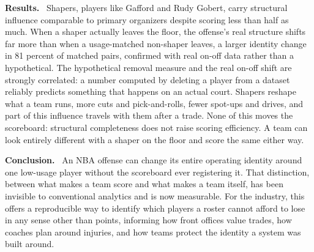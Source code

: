 \documentclass[11pt,letterpaper]{article}
\newcommand{\abssection}[1]{\textbf{#1.}~}
\begin{document}
\abssection{Results}
Shapers, players like Gafford and Rudy Gobert, carry structural
influence comparable to primary organizers despite scoring less than
half as much. When a shaper actually leaves the floor, the offense's
real structure shifts far more than when a usage-matched non-shaper
leaves, a larger identity change in 81 percent of matched pairs,
confirmed with real on-off data rather than a hypothetical. The
hypothetical removal measure and the real on-off shift are strongly
correlated: a number computed by deleting a player from a dataset
reliably predicts something that happens on an actual court. Shapers
reshape what a team runs, more cuts and pick-and-rolls, fewer
spot-ups and drives, and part of this influence travels with them
after a trade. None of this moves the scoreboard: structural
completeness does not raise scoring efficiency. A team can look
entirely different with a shaper on the floor and score the same
either way.

\abssection{Conclusion}
An NBA offense can change its entire operating identity around one
low-usage player without the scoreboard ever registering it. That
distinction, between what makes a team score and what makes a team
itself, has been invisible to conventional analytics and is now
measurable. For the industry, this offers a reproducible way to
identify which players a roster cannot afford to lose in any sense
other than points, informing how front offices value trades, how
coaches plan around injuries, and how teams protect the identity a
system was built around.
\end{document}
